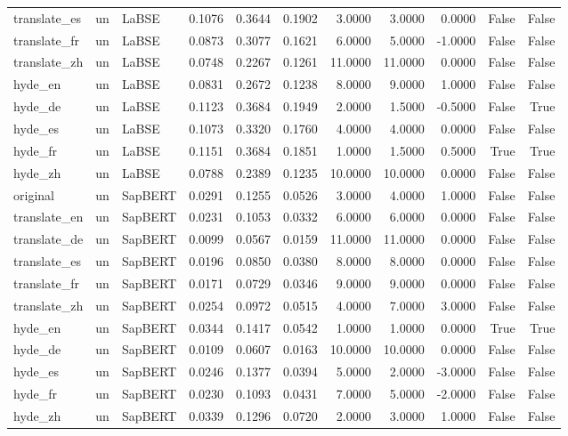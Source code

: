 \begin{tabular}{lllrrrrrrrr}
translate\_es & un & LaBSE & 0.1076 & 0.3644 & 0.1902 & 3.0000 & 3.0000 & 0.0000 & False & False \\
translate\_fr & un & LaBSE & 0.0873 & 0.3077 & 0.1621 & 6.0000 & 5.0000 & -1.0000 & False & False \\
translate\_zh & un & LaBSE & 0.0748 & 0.2267 & 0.1261 & 11.0000 & 11.0000 & 0.0000 & False & False \\
hyde\_en & un & LaBSE & 0.0831 & 0.2672 & 0.1238 & 8.0000 & 9.0000 & 1.0000 & False & False \\
hyde\_de & un & LaBSE & 0.1123 & 0.3684 & 0.1949 & 2.0000 & 1.5000 & -0.5000 & False & True \\
hyde\_es & un & LaBSE & 0.1073 & 0.3320 & 0.1760 & 4.0000 & 4.0000 & 0.0000 & False & False \\
hyde\_fr & un & LaBSE & 0.1151 & 0.3684 & 0.1851 & 1.0000 & 1.5000 & 0.5000 & True & True \\
hyde\_zh & un & LaBSE & 0.0788 & 0.2389 & 0.1235 & 10.0000 & 10.0000 & 0.0000 & False & False \\
original & un & SapBERT & 0.0291 & 0.1255 & 0.0526 & 3.0000 & 4.0000 & 1.0000 & False & False \\
translate\_en & un & SapBERT & 0.0231 & 0.1053 & 0.0332 & 6.0000 & 6.0000 & 0.0000 & False & False \\
translate\_de & un & SapBERT & 0.0099 & 0.0567 & 0.0159 & 11.0000 & 11.0000 & 0.0000 & False & False \\
translate\_es & un & SapBERT & 0.0196 & 0.0850 & 0.0380 & 8.0000 & 8.0000 & 0.0000 & False & False \\
translate\_fr & un & SapBERT & 0.0171 & 0.0729 & 0.0346 & 9.0000 & 9.0000 & 0.0000 & False & False \\
translate\_zh & un & SapBERT & 0.0254 & 0.0972 & 0.0515 & 4.0000 & 7.0000 & 3.0000 & False & False \\
hyde\_en & un & SapBERT & 0.0344 & 0.1417 & 0.0542 & 1.0000 & 1.0000 & 0.0000 & True & True \\
hyde\_de & un & SapBERT & 0.0109 & 0.0607 & 0.0163 & 10.0000 & 10.0000 & 0.0000 & False & False \\
hyde\_es & un & SapBERT & 0.0246 & 0.1377 & 0.0394 & 5.0000 & 2.0000 & -3.0000 & False & False \\
hyde\_fr & un & SapBERT & 0.0230 & 0.1093 & 0.0431 & 7.0000 & 5.0000 & -2.0000 & False & False \\
hyde\_zh & un & SapBERT & 0.0339 & 0.1296 & 0.0720 & 2.0000 & 3.0000 & 1.0000 & False & False \\

\end{tabular}
